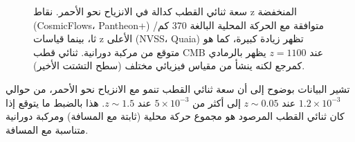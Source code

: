 \documentclass[12pt,a4paper]{article}
\begin{document}
	\begin{otherlanguage}{english}
		\begin{figure}[htbp]
			\centering
			\caption{سعة ثنائي القطب كدالة في الانزياح نحو الأحمر. نقاط z المنخفضة (CosmicFlows، Pantheon+) متوافقة مع الحركة المحلية البالغة 370 كم/ثا، بينما قياسات z الأعلى (NVSS، Quaia) تظهر زيادة كبيرة، كما هو متوقع من مركبة دورانية. ثنائي قطب CMB عند \(z=1100\) يظهر بالرمادي كمرجع لكنه ينشأ من مقياس فيزيائي مختلف (سطح التشتت الأخير).}
			\label{fig:dipole_growth}
		\end{figure}
	\end{otherlanguage}
	
	\noindent تشير البيانات بوضوح إلى أن سعة ثنائي القطب تنمو مع الانزياح نحو الأحمر، من حوالي \(1.2 \times 10^{-3}\) عند \(z\sim0.05\) إلى أكثر من \(5\times10^{-3}\) عند \(z\sim1.5\). هذا بالضبط ما يتوقع إذا كان ثنائي القطب المرصود هو مجموع حركة محلية (ثابتة مع المسافة) ومركبة دورانية متناسبة مع المسافة.
	
\end{document}

